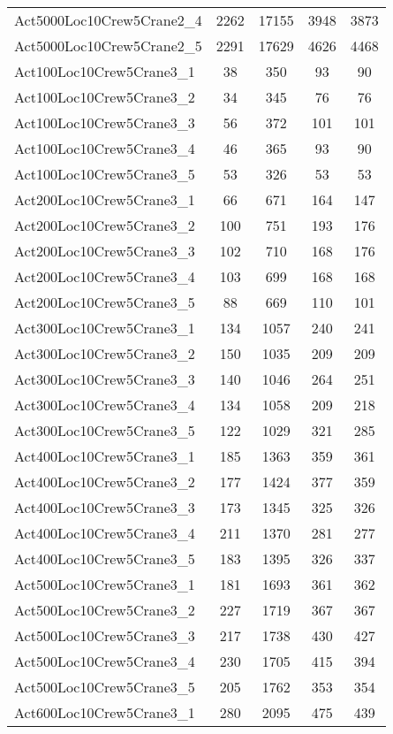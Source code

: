 \begin{center}
\begin{longtable}{ | l | c | c | c | c | }
Act5000Loc10Crew5Crane2\_4	&	2262	&	17155	&	3948	&	3873	\\
Act5000Loc10Crew5Crane2\_5	&	2291	&	17629	&	4626	&	4468	\\ \hline
Act100Loc10Crew5Crane3\_1	&	38	&	350	&	93	&	90	\\
Act100Loc10Crew5Crane3\_2	&	34	&	345	&	76	&	76	\\
Act100Loc10Crew5Crane3\_3	&	56	&	372	&	101	&	101	\\
Act100Loc10Crew5Crane3\_4	&	46	&	365	&	93	&	90	\\
Act100Loc10Crew5Crane3\_5	&	53	&	326	&	53	&	53	\\
Act200Loc10Crew5Crane3\_1	&	66	&	671	&	164	&	147	\\
Act200Loc10Crew5Crane3\_2	&	100	&	751	&	193	&	176	\\
Act200Loc10Crew5Crane3\_3	&	102	&	710	&	168	&	176	\\
Act200Loc10Crew5Crane3\_4	&	103	&	699	&	168	&	168	\\
Act200Loc10Crew5Crane3\_5	&	88	&	669	&	110	&	101	\\
Act300Loc10Crew5Crane3\_1	&	134	&	1057	&	240	&	241	\\
Act300Loc10Crew5Crane3\_2	&	150	&	1035	&	209	&	209	\\
Act300Loc10Crew5Crane3\_3	&	140	&	1046	&	264	&	251	\\
Act300Loc10Crew5Crane3\_4	&	134	&	1058	&	209	&	218	\\
Act300Loc10Crew5Crane3\_5	&	122	&	1029	&	321	&	285	\\
Act400Loc10Crew5Crane3\_1	&	185	&	1363	&	359	&	361	\\
Act400Loc10Crew5Crane3\_2	&	177	&	1424	&	377	&	359	\\
Act400Loc10Crew5Crane3\_3	&	173	&	1345	&	325	&	326	\\
Act400Loc10Crew5Crane3\_4	&	211	&	1370	&	281	&	277	\\
Act400Loc10Crew5Crane3\_5	&	183	&	1395	&	326	&	337	\\
Act500Loc10Crew5Crane3\_1	&	181	&	1693	&	361	&	362	\\
Act500Loc10Crew5Crane3\_2	&	227	&	1719	&	367	&	367	\\
Act500Loc10Crew5Crane3\_3	&	217	&	1738	&	430	&	427	\\
Act500Loc10Crew5Crane3\_4	&	230	&	1705	&	415	&	394	\\
Act500Loc10Crew5Crane3\_5	&	205	&	1762	&	353	&	354	\\
Act600Loc10Crew5Crane3\_1	&	280	&	2095	&	475	&	439	\\

\end{longtable}
\end{center}

